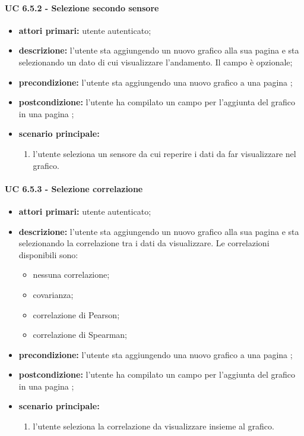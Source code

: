 			\paragraph{UC 6.5.2 - Selezione secondo sensore}
			\begin{itemize}
				\item \textbf{attori primari:} utente autenticato;
				\item \textbf{descrizione:} l'utente sta aggiungendo un nuovo grafico alla sua pagina  e sta selezionando un dato di cui visualizzare l'andamento. Il campo è opzionale;
				\item \textbf{precondizione:} l'utente sta aggiungendo una nuovo grafico a una pagina ;
				\item \textbf{postcondizione:} l'utente ha compilato un campo per l'aggiunta del grafico in una pagina ;
				\item \textbf{scenario principale:}
				\begin{enumerate}
					\item{l'utente seleziona un sensore da cui reperire i dati da far visualizzare nel grafico.}
				\end{enumerate}
			\end{itemize}

			\paragraph{UC 6.5.3 - Selezione correlazione}
			\begin{itemize}
				\item \textbf{attori primari:} utente autenticato;
				\item \textbf{descrizione:} l'utente sta aggiungendo un nuovo grafico alla sua pagina  e sta selezionando la correlazione tra i dati da visualizzare. Le correlazioni disponibili sono:
				\begin{itemize}
					\item nessuna correlazione;
					\item covarianza;
					\item correlazione di Pearson;
					\item correlazione di Spearman;
				\end{itemize}
				\item \textbf{precondizione:} l'utente sta aggiungendo una nuovo grafico a una pagina ;
				\item \textbf{postcondizione:} l'utente ha compilato un campo per l'aggiunta del grafico in una pagina ;
				\item \textbf{scenario principale:}
				\begin{enumerate}
					\item{l'utente seleziona la correlazione da visualizzare insieme al grafico.}
				\end{enumerate}
			\end{itemize}

